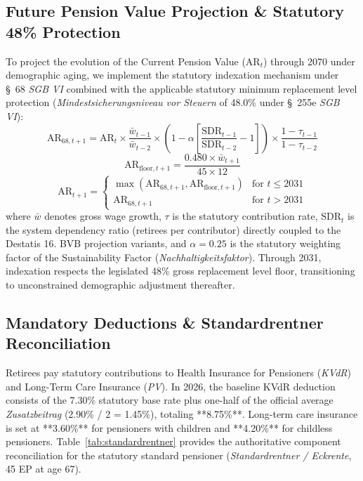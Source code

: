 \documentclass[conference]{IEEEtran}
\begin{document}
\subsection{Future Pension Value Projection & Statutory 48\% Protection}
To project the evolution of the Current Pension Value ($\text{AR}_t$) through 2070 under demographic aging, we implement the statutory indexation mechanism under \S~68 \textit{SGB VI} combined with the applicable statutory minimum replacement level protection (\textit{Mindestsicherungsniveau vor Steuern} of 48.0\% under \S~255e \textit{SGB VI}):
\begin{equation}
    \text{AR}_{68, t+1} = \text{AR}_t \times \frac{\bar{w}_{t-1}}{\bar{w}_{t-2}} \times \left( 1 - \alpha \left[ \frac{\text{SDR}_{t-1}}{\text{SDR}_{t-2}} - 1 \right] \right) \times \frac{1 - \tau_{t-1}}{1 - \tau_{t-2}}
\end{equation}
\begin{equation}
    \text{AR}_{\text{floor}, t+1} = \frac{0.480 \times \bar{w}_{t+1}}{45 \times 12}
\end{equation}
\begin{equation}
    \text{AR}_{t+1} = \begin{cases} 
        \max\left( \text{AR}_{68, t+1}, \text{AR}_{\text{floor}, t+1} \right) & \text{for } t \le 2031 \\
        \text{AR}_{68, t+1} & \text{for } t > 2031
    \end{cases}
\end{equation}
where $\bar{w}$ denotes gross wage growth, $\tau$ is the statutory contribution rate, $\text{SDR}_t$ is the system dependency ratio (retirees per contributor) directly coupled to the Destatis 16. BVB projection variants, and $\alpha = 0.25$ is the statutory weighting factor of the Sustainability Factor (\textit{Nachhaltigkeitsfaktor}). Through 2031, indexation respects the legislated 48\% gross replacement level floor, transitioning to unconstrained demographic adjustment thereafter.

\subsection{Mandatory Deductions \& Standardrentner Reconciliation}
Retirees pay statutory contributions to Health Insurance for Pensioners (\textit{KVdR}) and Long-Term Care Insurance (\textit{PV}). In 2026, the baseline KVdR deduction consists of the 7.30\% statutory base rate plus one-half of the official average \textit{Zusatzbeitrag} (2.90\% / 2 = 1.45\%), totaling **8.75\%**. Long-term care insurance is set at **3.60\%** for pensioners with children and **4.20\%** for childless pensioners. Table~\ref{tab:standardrentner} provides the authoritative component reconciliation for the statutory standard pensioner (\textit{Standardrentner / Eckrente}, 45 EP at age 67).
\end{document}

